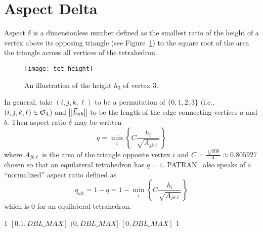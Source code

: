 \section{Aspect Delta}

Aspect $\delta$ is a dimensionless number defined as the smallest ratio of the
height of a vertex above its opposing triangle (see Figure~\ref{f:tet-height}) to
the square root of the area the triangle across all vertices of the tetrahedron. 
\begin{figure}[bhp]
  \centering
  \texttt{[image: tet-height]}
  \caption{
    An illustration of the height $h_3$ of vertex 3.%
                                                          \label{f:tet-height}}
\end{figure}
In general, take $(i,j,k,\ell)$ to be a permutation of $\{0,1,2,3\}$
(i.e., $(i,j,k,\ell)\in\mathfrak{S}_4$) and $\big\lVert{\vec L_{ab}}\big\rVert$ to be the length of the edge
connecting vertices $a$ and $b$.
Then aspect ratio $\delta$ may be written
\[
  q = \min_i\left\{C\frac{h_i}{\sqrt{A_{jk\ell}}}\right\}
\]
where $A_{jk\ell}$ is the area of the triangle opposite vertex $i$ and
$C = \frac{\sqrt[4]{108}}{4}\approx 0.805927$ chosen so that an equilateral tetrahedron has $q = 1$.
PATRAN~\cite{patran:03} also speaks of a ``normalized'' aspect ratio defined as
\[
  q_{alt} = 1 - q = 1 - \min_i\left\{C\frac{h_i}{\sqrt{A_{jk\ell}}}\right\}
\]
which is 0 for an equilateral tetrahedron.

%
{$1$}%
{$[0.1,DBL\_MAX]$}%
{$(0,DBL\_MAX]$}%
{$[0,DBL\_MAX]$}%
{$1$}%
{\cite{patran:03}}%
{\nsup}%


